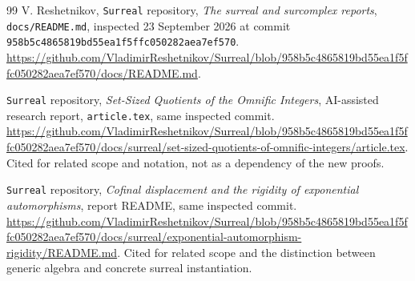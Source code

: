 \documentclass[11pt,letterpaper]{article}
\numberwithin{equation}{section}
\theoremstyle{definition}
\theoremstyle{remark}
\newcommand{\repoSHA}{\nolinkurl{958b5c4865819bd55ea1f5ffc050282aea7ef570}}
\begin{document}
\begin{thebibliography}{99}
V. Reshetnikov, \texttt{Surreal} repository, \emph{The surreal and surcomplex
reports}, \texttt{docs/README.md}, inspected 23 September 2026 at commit
\repoSHA.
\url{https://github.com/VladimirReshetnikov/Surreal/blob/958b5c4865819bd55ea1f5ffc050282aea7ef570/docs/README.md}.

\texttt{Surreal} repository, \emph{Set-Sized Quotients of the Omnific Integers},
AI-assisted research report, \texttt{article.tex}, same inspected commit.
\url{https://github.com/VladimirReshetnikov/Surreal/blob/958b5c4865819bd55ea1f5ffc050282aea7ef570/docs/surreal/set-sized-quotients-of-omnific-integers/article.tex}.
Cited for related scope and notation, not as a dependency of the new proofs.

\texttt{Surreal} repository, \emph{Cofinal displacement and the rigidity of
exponential automorphisms}, report README, same inspected commit.
\url{https://github.com/VladimirReshetnikov/Surreal/blob/958b5c4865819bd55ea1f5ffc050282aea7ef570/docs/surreal/exponential-automorphism-rigidity/README.md}.
Cited for related scope and the distinction between generic algebra and concrete
surreal instantiation.
\end{thebibliography}
\end{document}
